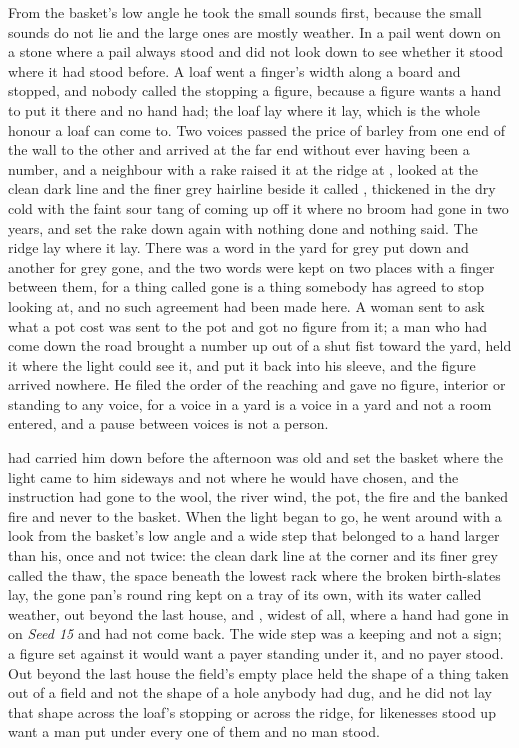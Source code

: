 From the basket's low angle he took the small sounds first, because the small sounds do not lie and the large ones are mostly weather. In  a pail went down on a stone where a pail always stood and did not look down to see whether it stood where it had stood before. A loaf went a finger's width along a board and stopped, and nobody called the stopping a figure, because a figure wants a hand to put it there and no hand had; the loaf lay where it lay, which is the whole honour a loaf can come to. Two voices passed the price of barley from one end of the wall to the other and arrived at the far end without ever having been a number, and a neighbour with a rake raised it at the ridge at , looked at the clean dark line and the finer grey hairline beside it called , thickened in the dry cold with the faint sour tang of  coming up off it where no broom had gone in two years, and set the rake down again with nothing done and nothing said. The ridge lay where it lay. There was a word in the yard for grey put down and another for grey gone, and the two words were kept on two places with a finger between them, for a thing called gone is a thing somebody has agreed to stop looking at, and no such agreement had been made here. A woman sent to ask what a pot cost was sent to the pot and got no figure from it; a man who had come down the road brought a number up out of a shut fist toward the yard, held it where the light could see it, and put it back into his sleeve, and the figure arrived nowhere. He filed the order of the reaching and gave no figure, interior or standing to any voice, for a voice in a yard is a voice in a yard and not a room entered, and a pause between voices is not a person.

 had carried him down before the afternoon was old and set the basket where the light came to him sideways and not where he would have chosen, and the instruction had gone to the wool, the river wind, the pot, the fire and the banked fire and never to the basket. When the light began to go, he went around  with a look from the basket's low angle and a wide step that belonged to a hand larger than his, once and not twice: the clean dark line at the corner and its finer grey called the thaw, the space beneath the lowest rack where the broken birth-slates lay, the gone pan's round ring kept on a tray of its own,  with its water called weather,  out beyond the last house, and , widest of all, where a hand had gone in on \emph{Seed 15} and had not come back. The wide step was a keeping and not a sign; a figure set against it would want a payer standing under it, and no payer stood. Out beyond the last house the field's empty place held the shape of a thing taken out of a field and not the shape of a hole anybody had dug, and he did not lay that shape across the loaf's stopping or across the ridge, for likenesses stood up want a man put under every one of them and no man stood.

